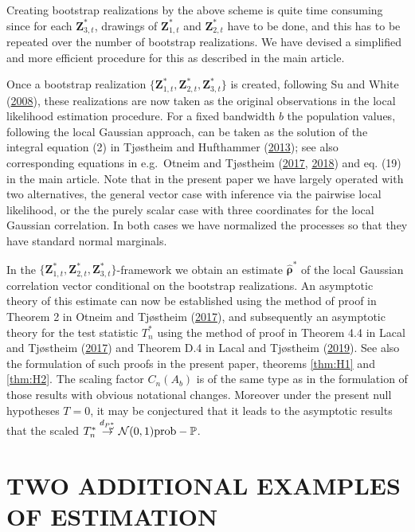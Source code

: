 \documentclass[
  12pt,
  letterpaper]{article}
\numberwithin{equation}{section}
\newcommand{\Z}{\bm{Z}}
\newcommand{\hfrho}{\widehat{\bm{\rho}}}
\begin{document}
Creating bootstrap realizations by the above scheme is quite time consuming since
for each \(\Z_{3,t}^*\), drawings of \(\Z_{1,t}^*\) and \(\Z_{2,t}^*\) have to be done, and this has to be repeated over the number of bootstrap realizations. We have devised a simplified and more efficient procedure for this as described in the main article.

Once a bootstrap realization \(\{\Z_{1,t}^*,\Z_{2,t}^*,\Z_{3,t}^*\}\) is created, following Su and White (\protect\hyperlink{ref-su2008nonparametric}{2008}), these realizations are now taken as the original observations in the local likelihood estimation procedure. For a fixed bandwidth \(b\) the population values, following the local Gaussian approach, can be taken as the solution of the integral equation (2) in Tjøstheim and Hufthammer (\protect\hyperlink{ref-tjostheim2013local}{2013}); see also corresponding equations in e.g.~Otneim and Tjøstheim (\protect\hyperlink{ref-otneim2017locally}{2017}, \protect\hyperlink{ref-otneim2017conditional}{2018}) and eq. (19) in the main article. Note that in the present paper we have largely operated with two alternatives, the general vector case with inference via the pairwise local likelihood, or the the purely scalar case with three coordinates for the local Gaussian correlation. In both cases we have normalized the processes so that they have standard normal marginals.

In the \(\{\Z_{1,t}^*,\Z_{2,t}^*,\Z_{3,t}^*\}\)-framework we obtain an estimate \(\hfrho^*\) of the local Gaussian correlation vector conditional on the bootstrap realizations. An asymptotic theory of this estimate can now be established using the method of proof in Theorem 2 in Otneim and Tjøstheim (\protect\hyperlink{ref-otneim2017locally}{2017}), and subsequently an asymptotic theory for the test statistic \(T_n^*\) using the method of proof in Theorem 4.4 in Lacal and Tjøstheim (\protect\hyperlink{ref-lacal2017local}{2017}) and Theorem D.4 in Lacal and Tjøstheim (\protect\hyperlink{ref-lacal2018estimating}{2019}). See also the formulation of such proofs in the present paper, theorems \ref{thm:H1} and \ref{thm:H2}. The scaling factor \(C_n(A_b)\) is of the same type as in the formulation of those results with obvious notational changes. Moreover under the present null hypotheses \(T = 0\), it may be conjectured that it leads to the asymptotic results that the scaled \(T_n^* \buildrel {d_{P^*_{\omega}}} \over {\to} {\cal N}(0,1)\mbox{prob}-\mathbb{P}\).

\hypertarget{two-additional-examples-of-estimation}{%
\section{TWO ADDITIONAL EXAMPLES OF ESTIMATION}\label{two-additional-examples-of-estimation}}
\end{document}

